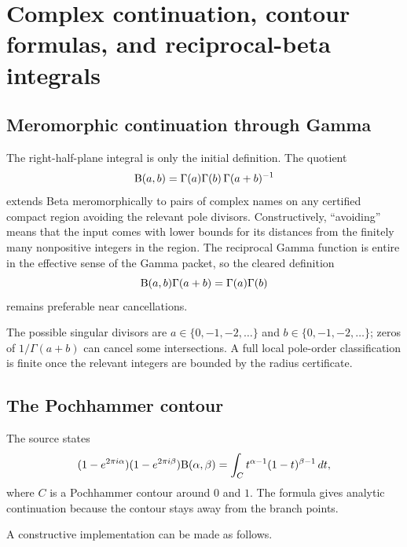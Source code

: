 \section{Complex continuation, contour formulas, and reciprocal-beta integrals}
\label{sec:complex}

\subsection{Meromorphic continuation through Gamma}

The right-half-plane integral is only the initial definition.  The quotient
\[
 \mathrm B(a,b)=\Gamma(a)\Gamma(b)\,\Gamma(a+b)^{-1}
\]
extends Beta meromorphically to pairs of complex names on any certified compact region avoiding the relevant pole divisors.  Constructively, ``avoiding'' means that the input comes with lower bounds for its distances from the finitely many nonpositive integers in the region.  The reciprocal Gamma function is entire in the effective sense of the Gamma packet, so the cleared definition
\[
 \mathrm B(a,b)\Gamma(a+b)=\Gamma(a)\Gamma(b)
\]
remains preferable near cancellations.

The possible singular divisors are $a\in\{0,-1,-2,\dots\}$ and
$b\in\{0,-1,-2,\dots\}$; zeros of $1/\Gamma(a+b)$ can cancel some intersections.  A full local pole-order classification is finite once the relevant integers are bounded by the radius certificate.

\subsection{The Pochhammer contour}

The source states
\begin{equation}
 (1-e^{2\pi i\alpha})(1-e^{2\pi i\beta})\mathrm B(\alpha,\beta)
 =
 \int_C t^{\alpha-1}(1-t)^{\beta-1}\,dt,
 \label{eq:pochhammer}
\end{equation}
where $C$ is a Pochhammer contour around $0$ and $1$.  The formula gives analytic continuation because the contour stays away from the branch points.

A constructive implementation can be made as follows.

